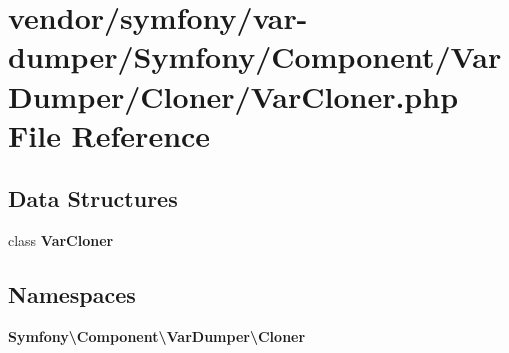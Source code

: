 \section{vendor/symfony/var-\/dumper/\+Symfony/\+Component/\+Var\+Dumper/\+Cloner/\+Var\+Cloner.php File Reference}
\label{_var_cloner_8php}
\subsection*{Data Structures}
\begin{DoxyCompactItemize}
\item 
class {\bf Var\+Cloner}
\end{DoxyCompactItemize}
\subsection*{Namespaces}
\begin{DoxyCompactItemize}
\item 
 {\bf Symfony\textbackslash{}\+Component\textbackslash{}\+Var\+Dumper\textbackslash{}\+Cloner}
\end{DoxyCompactItemize}
